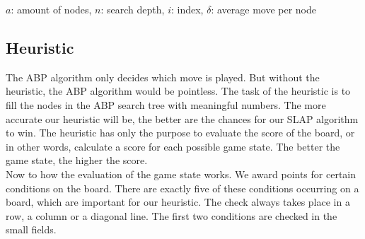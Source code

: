 \begin{center}
$a$: amount of nodes,
$n$: search depth,
$i$: index,
$\delta$: average move per node
\end{center}


\subsection{Heuristic} \label{heuristic}
The \ac{ABP} algorithm only decides which move is played. But without the heuristic, the \ac{ABP} algorithm would be pointless. The task of the heuristic is to fill the nodes in the \ac{ABP} search tree with meaningful numbers. The more accurate our heuristic will be, the better are the chances for our \ac{SLAP} algorithm to win. The heuristic has only the purpose to evaluate the score of the board, or in other words, calculate a score for each possible \ac{game state}. The better the game state, the higher the score.\\

Now to how the evaluation of the game state works. We award points for certain  \acp{condition} on the board. There are exactly five of these conditions occurring on a board, which are important for our heuristic. The check always takes place in a row, a column or a diagonal line. The first two conditions are checked in the small fields.\\


